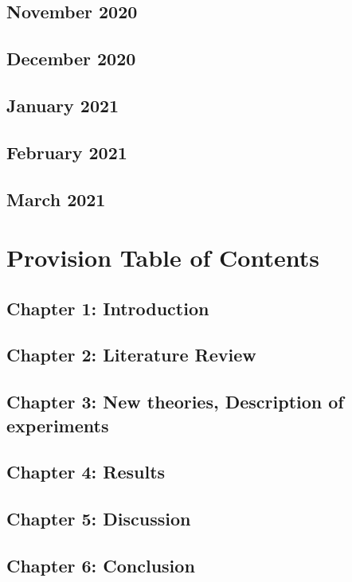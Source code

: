 \documentclass{article}
\begin{document}
	\subsection{November 2020}
	
	\subsection{December 2020}
	
	\subsection{January 2021}
	
	\subsection{February 2021}
	
	\subsection{March 2021}
	
	\section{Provision Table of Contents}
	\subsection{Chapter 1: Introduction}
	\subsection{Chapter 2: Literature Review}
	\subsection{Chapter 3: New theories, Description of experiments}
	\subsection{Chapter 4: Results}
	\subsection{Chapter 5: Discussion}
	\subsection{Chapter 6: Conclusion}
\end{document}
